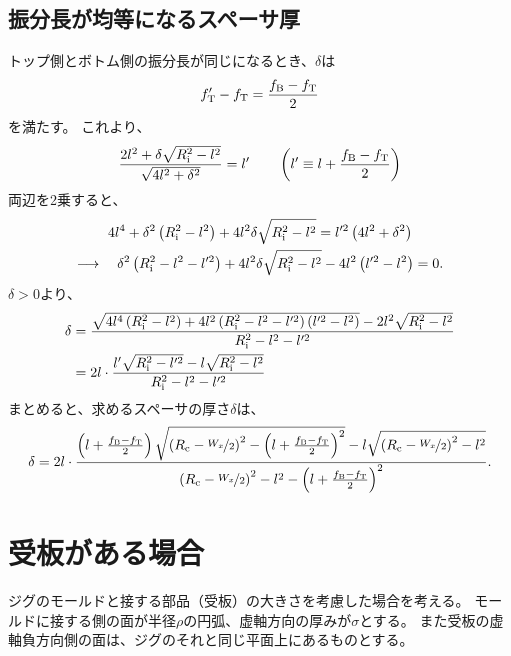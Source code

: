 \subsection{振分長が均等になるスペーサ厚}
トップ側とボトム側の振分長が同じになるとき、$\delta$は
\begin{align*}
  f'_\text T - f_\text T = \frac{f_\text B - f_\text T}2
\end{align*}
を満たす。
これより、
\begin{align*}
  \frac{2l^2+\delta\sqrt{R_\text i^2-l^2}}{\sqrt{4l^2+\delta^2}} = l'\qquad
  \left(l' \equiv l + \frac{f_\text B-f_\text T}2\right)
\end{align*}
両辺を2乗すると、
\begin{gather*}
  4l^4+\delta^2\left(R_\text i^2-l^2\right)+4l^2\delta\sqrt{R_\text i^2-l^2}
  = l'^2\left(4l^2+\delta^2\right)\\
  \longrightarrow\quad
  \delta^2\left(R_\text i^2-l^2-l'^2\right)+4l^2\delta\sqrt{R_\text i^2-l^2} - 4l^2\left(l'^2 - l^2\right)
  = 0.
\end{gather*}
$\delta > 0$より、
\begin{align*}
  \delta
  &= \frac{\sqrt{4l^4\left(R_\text i^2-l^2\right) +4l^2\left(R_\text i^2-l^2-l'^2\right)\left(l'^2 - l^2\right)}-2l^2\sqrt{R_\text i^2-l^2}}{R_\text i^2-l^2-l'^2}\\
  &= 2l\cdot\frac{l'\sqrt{R_\text i^2-l'^2}-l\sqrt{R_\text i^2-l^2}}{R_\text i^2-l^2-l'^2}
\end{align*}
まとめると、求めるスペーサの厚さ$\delta$は、
\begin{align*}
  \delta
  = 2l\cdot
    \frac{\left(l+\frac{f_\text B-f_\text T}2\right)\sqrt{\left(R_\text c-\nicefrac{W_x}2\right)^2-\left(l+\frac{f_\text B-f_\text T}2\right)^2}-l\sqrt{\left(R_\text c-\nicefrac{W_x}2\right)^2-l^2}}
         {\left(R_\text c-\nicefrac{W_x}2\right)^2-l^2-\left(l+\frac{f_\text B-f_\text T}2\right)^2}.
\end{align*}




\clearpage
\section{受板がある場合}
ジグのモールドと接する部品（受板）の大きさを考慮した場合を考える。
モールドに接する側の面が半径$\rho$の円弧、虚軸方向の厚みが$\sigma$とする。
また受板の虚軸負方向側の面は、ジグのそれと同じ平面上にあるものとする。

